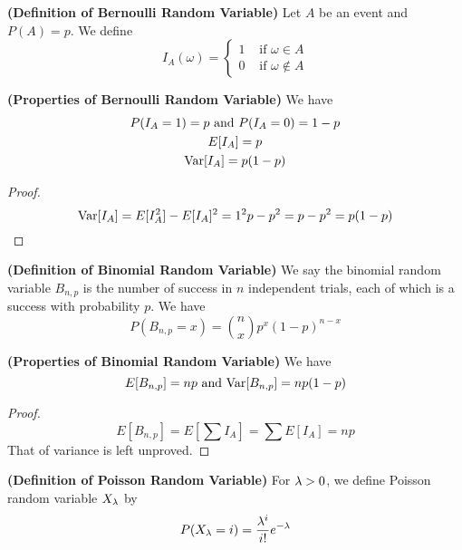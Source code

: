 \documentclass{report}
\begin{document}
\begin{definition}
\label{2.1.9}
\textbf{(Definition of Bernoulli Random Variable)} Let $A$ be an event and $P(A)=p$. We define
\begin{equation}
I_A(\omega)=\begin{cases}
  1& \text{ if  }\omega \in A\\
  0& \text{ if  }\omega\not\in A
\end{cases}
\end{equation}
\end{definition}
\begin{theorem}
\label{2.1.10}
\textbf{(Properties of Bernoulli Random Variable)} We have
\begin{gather}
P(I_A=1)=p \text{ and }P(I_A=0)=1-p\\ 
E[I_A]=p\\
\text{Var} [I_A]=p(1-p)
\end{gather}
\end{theorem}
\begin{proof}
\begin{equation}
\text{Var} [I_A]=E[I_A^2]-E[I_A]^2=1^2p-p^2=p-p^2=p(1-p)
\end{equation}
\end{proof}
\begin{definition}
\textbf{(Definition of Binomial Random Variable)} We say the binomial random variable $B_{n,p}$ is the number of success in $n$ independent trials, each of which is a success with probability $p$. We have
\begin{equation}
P(B_{n,p}=x)=\binom{n}{x}p^x (1-p)^{n-x}
\end{equation}
\end{definition}
\begin{theorem}
\textbf{(Properties of Binomial Random Variable)} We have
\begin{equation}
E[B_{n,p}]=np \text{ and }\text{Var} [B_{n,p}]= np(1-p)
\end{equation}
\end{theorem}
\begin{proof} 
\begin{equation}
E[B_{n,p}]=E[\sum I_A]=\sum E[I_A]=np
\end{equation}
That of variance is left unproved. 
\end{proof}
\begin{definition}
  \textbf{(Definition of Poisson Random Variable)} For $\lambda >0$, we define Poisson random variable $X_{\lambda }$ by
  \begin{equation}
  P(X_\lambda =i)=\frac{\lambda ^i}{i!}e^{-\lambda }
  \end{equation}
\end{definition}
\end{document}
